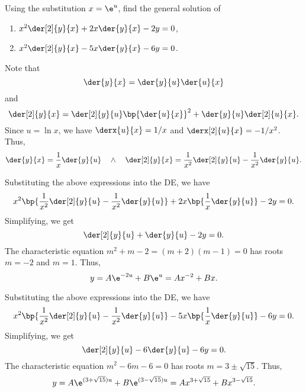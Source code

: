 \begin{problem}
    Using the substitution $x= \e^u$, find the general solution of
    \begin{enumerate}
        \item $x^2 \der[2]{y}{x} + 2x \der{y}{x} - 2y = 0$,
        \item $x^2 \der[2]{y}{x} - 5x \der{y}{x} - 6y = 0$.
    \end{enumerate}
\end{problem}
\begin{solution}
    Note that \[\der{y}{x} = \der{y}{u} \der{u}{x}\] and \[\der[2]{y}{x} = \der[2]{y}{u} \bp{\der{u}{x}}^2 + \der{y}{u} \der[2]{u}{x}.\] Since $u = \ln x$, we have $\derx{u}{x} = 1/x$ and $\derx[2]{u}{x} = -1/x^2$. Thus, \[\der{y}{x} = \frac1x \der{y}{u} \quad \land \quad \der[2]{y}{x} = \frac1{x^2} \der[2]{y}{u} - \frac1{x^2} \der{y}{u}.\]

    \begin{ppart}
        Substituting the above expressions into the DE, we have \[x^2 \bp{\frac1{x^2} \der[2]{y}{u} - \frac1{x^2} \der{y}{u}} + 2x \bp{\frac1x \der{y}{u}} - 2y = 0.\] Simplifying, we get \[\der[2]{y}{u} + \der{y}{u} - 2y = 0.\] The characteristic equation $m^2 + m - 2 = (m+2)(m-1) = 0$ has roots $m = -2$ and $m = 1$. Thus, \[y = A\e^{-2u} + B\e^u = Ax^{-2} + Bx.\]
    \end{ppart}
    \begin{ppart}
        Substituting the above expressions into the DE, we have \[x^2 \bp{\frac1{x^2} \der[2]{y}{u} - \frac1{x^2} \der{y}{u}} - 5x \bp{\frac1x \der{y}{u}} - 6y = 0.\] Simplifying, we get \[\der[2]{y}{u} - 6 \der{y}{u} - 6y = 0.\] The characteristic equation $m^2 - 6m - 6 = 0$ has roots $m = 3 \pm \sqrt{15}$. Thus, \[y = A\e^{(3 + \sqrt{15}) u} + B\e^{(3 - \sqrt{15}) u} = Ax^{3+\sqrt{15}} + Bx^{3 - \sqrt{15}}.\]
    \end{ppart}
\end{solution}

